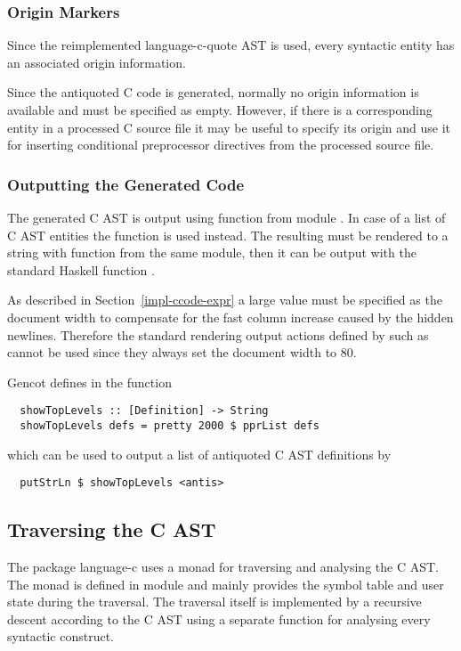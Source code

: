 \subsubsection{Origin Markers}

Since the reimplemented language-c-quote AST is used, every syntactic entity has an associated origin information.

Since the antiquoted C code is generated, normally no origin information is available and must be specified as
empty. However, if there is a corresponding entity in a processed C source file it may be useful to specify 
its origin and use it for inserting conditional preprocessor directives from the processed source file.

\subsubsection{Outputting the Generated Code}

The generated C AST is output using function  from module . In case of 
a list of C AST entities the function  is used instead. The resulting
 must be rendered to a string with function  from the same module, then it can be 
output with the standard Haskell function . 

As described in 
Section~\ref{impl-ccode-expr} a large value must be specified as the document width to compensate for the 
fast column increase caused by the hidden newlines. Therefore the standard rendering output actions defined
by  such as  cannot be used since they always set the document
width to 80.

Gencot defines in  the function
\begin{verbatim}
  showTopLevels :: [Definition] -> String
  showTopLevels defs = pretty 2000 $ pprList defs
\end{verbatim}
which can be used to output a list  of antiquoted C AST definitions by
\begin{verbatim}
  putStrLn $ showTopLevels <antis>
\end{verbatim}

\subsection{Traversing the C AST}
\label{impl-ccode-trav}

The package language-c uses a monad  for traversing and analysing the C AST. The monad is defined in module
 and mainly provides the symbol table and user state during the traversal.
The traversal itself is implemented by a recursive descent according to the C AST using a separate function
for analysing every syntactic construct. 

